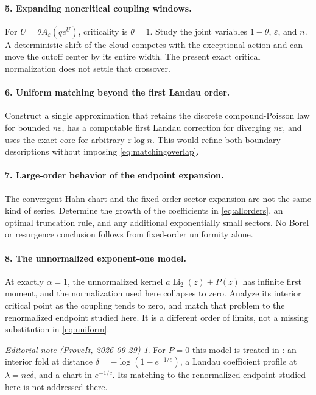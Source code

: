 \documentclass[11pt,a4paper]{article}
\theoremstyle{definition}\newtheorem{definition}[theorem]{Definition}
\theoremstyle{remark}\newtheorem{remark}[theorem]{Remark}
\newtheorem*{ednote}{Editorial note (ProveIt, 2026-09-29)}
\newcommand{\eps}{\varepsilon}
\newcommand{\Li}{\operatorname{Li}}
\newcommand{\1}{\mathbf 1}
\begin{document}
\paragraph{5. Expanding noncritical coupling windows.}
For $U=\theta A_{\eps}(qe^U)$, criticality is $\theta=1$.
Study the joint variables $1-\theta$, $\eps$, and $n$.
A deterministic shift of the cloud competes with the exceptional action
and can move the cutoff center by its entire width. The present exact
critical normalization does not settle that crossover.

\paragraph{6. Uniform matching beyond the first Landau order.}
Construct a single approximation that retains the discrete
compound-Poisson law for bounded $n\eps$, has a computable first
Landau correction for diverging $n\eps$, and uses the exact core for
arbitrary $\eps\log n$. This would refine both boundary descriptions
without imposing \eqref{eq:matchingoverlap}.

\paragraph{7. Large-order behavior of the endpoint expansion.}
The convergent Hahn chart and the fixed-order sector expansion are
not the same kind of series. Determine the growth of the coefficients
in \eqref{eq:allorders}, an optimal truncation rule, and any additional
exponentially small sectors. No Borel or resurgence conclusion follows
from fixed-order uniformity alone.

\paragraph{8. The unnormalized exponent-one model.}
At exactly $\alpha=1$, the unnormalized kernel
$a\Li_2(z)+P(z)$ has infinite first moment, and the normalization used
here collapses to zero. Analyze its interior critical point as the
coupling tends to zero, and match that problem to the renormalized
endpoint studied here. It is a different order of limits, not a missing
substitution in \eqref{eq:uniform}.
\begin{ednote}
For $P=0$ this model is treated in
: an interior fold at
distance $\delta=-\log(1-e^{-1/c})$, a Landau coefficient profile at
$\lambda=nc\delta$, and a chart in $e^{-1/c}$. Its matching to the
renormalized endpoint studied here is not addressed there.
\end{ednote}
\end{document}
